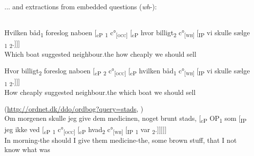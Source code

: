 \documentclass[output=paper]{LSP/langsci}
\begin{document}
    \z
\z


... and extractions from embedded questions (\textit{wh}{}-):

\ea%
    \label{ex:vikner:18}
       \citep[63]{ChristensenEtAl2013escape}\\
  \ea 
  \gll  {  }  { Hvilken båd\textsubscript{1} }  { foreslog }  { naboen }  { [{\textsubscript{c}}\textsubscript{P} {\longrule}\textsubscript{1}  {c°}\textsubscript{[}\textsc{\textsubscript{occ}}\textsubscript{]} }  { [{\textsubscript{c}}\textsubscript{P } }  { hvor billigt\textsubscript{2} }  { {c°}\textsubscript{[}\textsc{\textsubscript{wh}}\textsubscript{]} }  { [\textsubscript{IP} }  { vi }  { skulle }  { sælge }  { {\longrule}\textsubscript{1} }  { {\longrule}\textsubscript{2}.]]]}\\
{  }  { {Which   boat} }  { {suggested} }  { {neighbour.the} }  {  }  {  }  { {how cheaply} }  {  }  {  }  { {we} }  { {should} }  { {sell} }  {  }  { }\\
  \glt

  \ex
  \gll {  }  { Hvor billigt\textsubscript{2} }  { foreslog }  { naboen }  { [{\textsubscript{c}}\textsubscript{P} {\longrule}\textsubscript{2}  {c°}\textsubscript{[}\textsc{\textsubscript{occ}}\textsubscript{]} }  { [{\textsubscript{c}}\textsubscript{P } }  { hvilken båd\textsubscript{1} }  { {c°}\textsubscript{[}\textsc{\textsubscript{wh}}\textsubscript{]} }  { [\textsubscript{IP} }  { vi }  { skulle }  { sælge }  { {\longrule}\textsubscript{1} }  { {\longrule}\textsubscript{2}.]]]}\\
 {  }  { {How cheaply} }  { {suggested} }  { {neighbour.the} }  {  }  {  }  { {which   boat} }  {  }  {  }  { {we} }  { {should} }  { {sell} }  {  }  { }\\
  \z
\z
 
 


\ea%
    \label{ex:vikner:19}
    
     (\url{http://ordnet.dk/ddo/ordbog?query=stads}, \citealt{HjorthKristensen20032005})\\

    \gll  {  }  { Om }  { morgenen }  { skulle }  { jeg }  { give }  { dem }  { medicinen, }  { noget }  { brunt }  { stads, }  { [{\textsubscript{c}}\textsubscript{P} OP\textsubscript{1} }  { som }  { [\textsubscript{IP} }  { jeg }  { ikke }  { ved }  { [{\textsubscript{c}}\textsubscript{P} {\longrule}\textsubscript{1}  {c°}\textsubscript{[}\textsc{\textsubscript{occ}}\textsubscript{]} }  { [{\textsubscript{c}}\textsubscript{P } }  { hvad\textsubscript{2}  {c°}\textsubscript{[}\textsc{\textsubscript{wh}}\textsubscript{]} }  { [\textsubscript{IP} }  { {\longrule}\textsubscript{1} }  { var }  { {\longrule}\textsubscript{2}.]]]]]}\\
 {  }  { {In} }  { {morning-the} }  { {should} }  { {I} }  { {give} }  { {them} }  { {medicine-the,} }  { {some} }  { {brown} }  { {stuff,} }  {  }  { {that} }  {  }  { {I} }  { {not} }  { {know} }  {  }  {  }  { {what} }  {  }  {  }  { {was} }  { }\\
    \z
\end{document}
